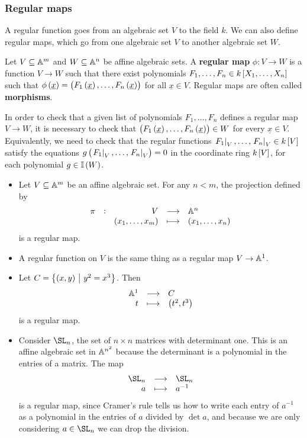 \subsubsection{Regular maps}

A regular function goes from an algebraic set $ V $ to the field $ k $. We can also define regular maps, which go from one algebraic set $ V $ to another algebraic set $ W $.

\begin{definition*}
Let $ V \subseteq \AA^m $ and $ W \subseteq \AA^n $ be affine algebraic sets. A \textbf{regular map} $ \phi : V \to W $ is a function $ V \to W $ such that there exist polynomials $ F_1, \dots, F_n \in k\sbr{X_1, \dots, X_n} $ such that $ \phi\br{\underline{x}} = \br{F_1\br{\underline{x}}, \dots, F_n\br{\underline{x}}} $ for all $ \underline{x} \in V $. Regular maps are often called \textbf{morphisms}.
\end{definition*}

\begin{note*}
In order to check that a given list of polynomials $ F_1, \dots, F_n $ defines a regular map $ V \to W $, it is necessary to check that $ \br{F_1\br{\underline{x}}, \dots, F_n\br{\underline{x}}} \in W $ for every $ \underline{x} \in V $. Equivalently, we need to check that the regular functions $ \eval{F_1}_V, \dots, \eval{F_n}_V \in k\sbr{V} $ satisfy the equations $ g\br{\eval{F_1}_V, \dots, \eval{F_n}_V} = 0 $ in the coordinate ring $ k\sbr{V} $, for each polynomial $ g \in \II\br{W} $.
\end{note*}

\pagebreak

\begin{example*}
\hfill
\begin{itemize}
\item Let $ V \subseteq \AA^m $ be an affine algebraic set. For any $ n < m $, the projection defined by
$$ \function[\pi]{V}{\AA^n}{\br{x_1, \dots, x_m}}{\br{x_1, \dots, x_n}} $$
is a regular map.
\item A regular function on $ V $ is the same thing as a regular map $ V \to \AA^1 $.
\item Let $ C = \cbr{\br{x, y} \st y^2 = x^3} $. Then
$$ \function{\AA^1}{C}{t}{\br{t^2, t^3}} $$
is a regular map.
\item Consider $ \SL_n $, the set of $ n \times n $ matrices with determinant one. This is an affine algebraic set in $ \AA^{n^2} $ because the determinant is a polynomial in the entries of a matrix. The map
$$ \function{\SL_n}{\SL_n}{a}{a^{-1}} $$
is a regular map, since Cramer's rule tells us how to write each entry of $ a^{-1} $ as a polynomial in the entries of $ a $ divided by $ \det a $, and because we are only considering $ a \in \SL_n $ we can drop the division.
\end{itemize}
\end{example*}

